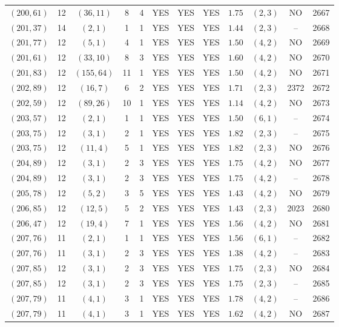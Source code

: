 \begin{longtable}{|c|c|c|c|c|c|c|c|c|c|c|c|}
$(200,61)$ & 12 & $(36,11)$ & 8 & 4 & YES & YES & YES & $1.75$ & $(2,3)$ & NO & 2667\\
$(201,37)$ & 14 & $(2,1)$ & 1 & 1 & YES & YES & YES & $1.44$ & $(2,3)$ & -- & 2668\\
$(201,77)$ & 12 & $(5,1)$ & 4 & 1 & YES & YES & YES & $1.50$ & $(4,2)$ & NO & 2669\\
$(201,61)$ & 12 & $(33,10)$ & 8 & 3 & YES & YES & YES & $1.60$ & $(4,2)$ & NO & 2670\\
$(201,83)$ & 12 & $(155,64)$ & 11 & 1 & YES & YES & YES & $1.50$ & $(4,2)$ & NO & 2671\\
$(202,89)$ & 12 & $(16,7)$ & 6 & 2 & YES & YES & YES & $1.71$ & $(2,3)$ & 2372 & 2672\\
$(202,59)$ & 12 & $(89,26)$ & 10 & 1 & YES & YES & YES & $1.14$ & $(4,2)$ & NO & 2673\\
$(203,57)$ & 12 & $(2,1)$ & 1 & 1 & YES & YES & YES & $1.50$ & $(6,1)$ & -- & 2674\\
$(203,75)$ & 12 & $(3,1)$ & 2 & 1 & YES & YES & YES & $1.82$ & $(2,3)$ & -- & 2675\\
$(203,75)$ & 12 & $(11,4)$ & 5 & 1 & YES & YES & YES & $1.82$ & $(2,3)$ & NO & 2676\\
$(204,89)$ & 12 & $(3,1)$ & 2 & 3 & YES & YES & YES & $1.75$ & $(4,2)$ & NO & 2677\\
$(204,89)$ & 12 & $(3,1)$ & 2 & 3 & YES & YES & YES & $1.75$ & $(4,2)$ & -- & 2678\\
$(205,78)$ & 12 & $(5,2)$ & 3 & 5 & YES & YES & YES & $1.43$ & $(4,2)$ & NO & 2679\\
$(206,85)$ & 12 & $(12,5)$ & 5 & 2 & YES & YES & YES & $1.43$ & $(2,3)$ & 2023 & 2680\\
$(206,47)$ & 12 & $(19,4)$ & 7 & 1 & YES & YES & YES & $1.56$ & $(4,2)$ & NO & 2681\\
$(207,76)$ & 11 & $(2,1)$ & 1 & 1 & YES & YES & YES & $1.56$ & $(6,1)$ & -- & 2682\\
$(207,76)$ & 11 & $(3,1)$ & 2 & 3 & YES & YES & YES & $1.38$ & $(4,2)$ & -- & 2683\\
$(207,85)$ & 12 & $(3,1)$ & 2 & 3 & YES & YES & YES & $1.75$ & $(2,3)$ & NO & 2684\\
$(207,85)$ & 12 & $(3,1)$ & 2 & 3 & YES & YES & YES & $1.75$ & $(2,3)$ & -- & 2685\\
$(207,79)$ & 11 & $(4,1)$ & 3 & 1 & YES & YES & YES & $1.78$ & $(4,2)$ & -- & 2686\\
$(207,79)$ & 11 & $(4,1)$ & 3 & 1 & YES & YES & YES & $1.62$ & $(4,2)$ & NO & 2687\\

\end{longtable}
